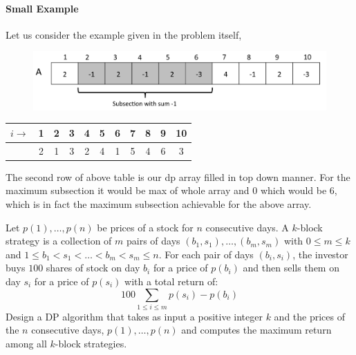 \documentclass[answers]{exam}
\begin{document}
\begin{questions}
\begin{solution}
\paragraph{Small Example}
Let us consider the example given in the problem itself,
\begin{figure}[H]
\centering
\includegraphics[scale=0.23]{subsection}
\end{figure}
 \begin{center}
        \begin{tabular}{|c|c|c|c|c|c|c|c|c|c|c|}
            \hline
            $i \rightarrow$  & 1 & 2 & 3 & 4 & 5 & 6 & 7 & 8 & 9 & 10  \\
            \hline
             & 2 & 1 & 3 & 2 & 4 & 1 & 5 & 4 & 6 & 3 \\
            \hline
        \end{tabular}
    \end{center}
The second row of above table is our dp array filled in top down manner. 
\newline For the maximum subsection it would be max of whole array and 0 which would be 6, which is in fact the maximum subsection achievable for the above array.

\end{solution}

\question[20] Let $p(1),\dots,p(n)$ be prices of a stock for $n$ consecutive days. 
A $k$-block strategy is a collection of $m$ pairs of days $(b_1,s_1),\dots,(b_m,s_m)$ with $0\leq m \leq k$ and $1\leq b_1<s_1<\dots<b_m<s_m\leq n$. 
For each pair of days $(b_i, s_i)$, the investor buys $100$ shares of stock on day $b_i$ for a price of $p(b_i)$ and then sells them on day $s_i$ for a price of $p(s_i)$ with a total return of:
$$100\sum_{1\leq i \leq m}p(s_i)-p(b_i)$$
Design a DP algorithm that takes as input a positive integer $k$ and the prices of the $n$ consecutive days, $p(1),\dots,p(n)$ and computes the maximum return among all $k$-block strategies.

\begin{solution}

\end{solution}
\end{questions}
\end{document}
